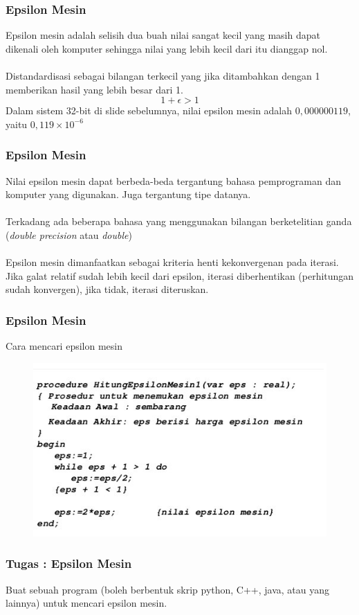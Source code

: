 \documentclass{beamer}
\begin{document}

\begin{frame}
\frametitle{Epsilon Mesin}
Epsilon mesin adalah selisih dua buah nilai sangat kecil yang masih dapat dikenali oleh komputer sehingga nilai yang lebih kecil dari itu dianggap nol.
\\\ \\Distandardisasi sebagai bilangan terkecil yang jika ditambahkan dengan 1 memberikan hasil yang lebih besar dari 1.
\begin{equation}
1+\epsilon > 1
\nonumber
\end{equation}
Dalam sistem 32-bit di slide sebelumnya, nilai epsilon mesin adalah $0,000000119$, yaitu $0,119\times 10^{-6}$
\end{frame}


\begin{frame}
\frametitle{Epsilon Mesin}
Nilai epsilon mesin dapat berbeda-beda tergantung bahasa pemprograman dan komputer yang digunakan. Juga tergantung tipe datanya.
\\\ \\Terkadang ada beberapa bahasa yang menggunakan bilangan berketelitian ganda (\textit{double precision} atau \textit{double})
\\\ \\Epsilon mesin dimanfaatkan sebagai kriteria henti kekonvergenan pada iterasi. Jika galat relatif sudah lebih kecil dari epsilon, iterasi diberhentikan (perhitungan sudah konvergen), jika tidak, iterasi diteruskan.
\end{frame}


\begin{frame}
\frametitle{Epsilon Mesin}
Cara mencari epsilon mesin 
\begin{figure}[htp]
\centering
\includegraphics[scale=0.50]{epsilon.jpg}
\end{figure}
\end{frame}


\begin{frame}
\frametitle{Tugas : Epsilon Mesin}
Buat sebuah program (boleh berbentuk skrip python, C++, java, atau yang lainnya) untuk mencari epsilon mesin.
\end{frame}

\end{document}
